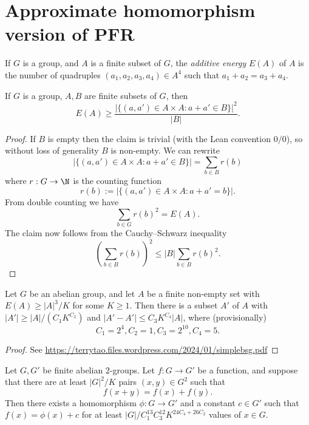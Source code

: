 \chapter{Approximate homomorphism version of PFR}

\begin{definition}\label{energy-def}\leanok  If $G$ is a group, and $A$ is a finite subset of $G$, the \emph{additive energy} $E(A)$ of $A$ is the number of quadruples $(a_1,a_2,a_3,a_4) \in A^4$ such that $a_1+a_2 = a_3+a_4$.
\end{definition}

\begin{lemma}\label{cs-bound}\leanok  If $G$ is a group, $A,B$ are finite subsets of $G$, then
$$ E(A) \geq \frac{|\{ (a,a') \in A \times A: a+a' \in B \}|^2}{|B|}.$$
\end{lemma}

\begin{proof}\leanok  If $B$ is empty then the claim is trivial (with the Lean convention $0/0$), so without loss of generality $B$ is non-empty.  We can rewrite
$$ |\{ (a,a') \in A \times A: a+a' \in B \}| = \sum_{b \in B} r(b)$$
where $r: G \to \N$ is the counting function
$$ r(b) := |\{ (a,a') \in A \times A: a+a' = b \}|.$$
From double counting we have
$$ \sum_{b \in G} r(b)^2 = E(A).$$
The claim now follows from the Cauchy--Schwarz inequality
$$ (\sum_{b \in B} r(b))^2 \leq |B| \sum_{b \in B} r(b)^2.$$
\end{proof}

\begin{lemma}\label{bsg}\leanok Let $G$ be an abelian group, and let $A$ be a finite non-empty set with $E(A) \geq |A|^3 / K$ for some $K \geq 1$.  Then there is a subset $A'$ of $A$ with $|A'| \geq |A| / (C_1 K^{C_2})$ and $|A'-A'| \leq C_3 K^{C_4} |A|$, where (provisionally)
$$ C_1 = 2^4, C_2 = 1, C_3 = 2^{10}, C_4 = 5.$$
\end{lemma}

\begin{proof}\leanok See \url{https://terrytao.files.wordpress.com/2024/01/simplebsg.pdf}
\end{proof}

\begin{theorem}\label{approx-hom-pfr}\leanok Let $G,G'$ be finite abelian $2$-groups.
  Let $f: G \to G'$ be a function, and suppose that there are at least $|G|^2 / K$ pairs $(x,y) \in G^2$ such that
$$ f(x+y) = f(x) + f(y).$$
Then there exists a homomorphism $\phi: G \to G'$ and a constant $c \in G'$
such that $f(x) = \phi(x)+c$ for at least $|G| / C_1^{13} C_3^{12}
K^{24C_4+26 C_2}$ values of $x \in G$.
\end{theorem}

